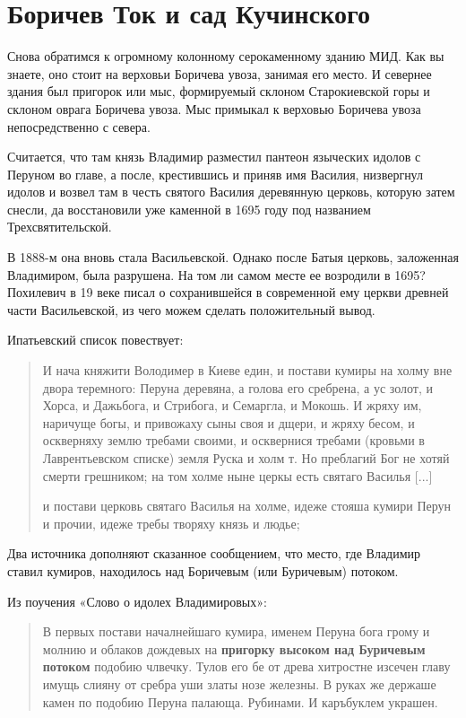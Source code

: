 \chapter {Боричев Ток и сад Кучинского}

Снова обратимся к огромному колонному серокаменному зданию МИД. Как вы знаете, оно стоит на верховьи Боричева увоза, занимая его место. И севернее здания был пригорок или  мыс, формируемый склоном Старокиевской горы и склоном оврага Боричева увоза. Мыс примыкал к верховью Боричева увоза непосредственно с севера.

Считается, что там князь Владимир разместил пантеон языческих идолов с Перуном во главе, а после, крестившись и приняв имя Василия, низвергнул идолов и возвел там в честь святого Василия деревянную церковь, которую затем снесли, да восстановили уже каменной в 1695 году под названием Трехсвятительской.

В 1888-м она вновь стала Васильевской. Однако после Батыя церковь, заложенная Владимиром, была разрушена. На том ли самом месте ее возродили в 1695? Похилевич в 19 веке писал о сохранившейся в современной ему церкви древней части Васильевской, из чего можем сделать положительный вывод.

Ипатьевский список повествует:

\begin{quotation}
И нача княжити Володимер в Киеве един, и постави кумиры на холму вне двора теремного: Перуна деревяна, а голова его сребрена, а ус золот, и Хорса, и Дажьбога, и Стрибога, и Семаргла, и Мокошь. И жряху им, наричуще богы, и привожаху сыны своя и дщери, и жряху бесом, и оскверняху землю требами своими, и осквернися требами (кровьми в Лаврентьевском списке) земля Руска и холм т. Но преблагий Бог не хотяй смерти грешником; на том холме ныне церкы есть святаго Василья [...]

и постави церковь святаго Василья на холме, идеже стояша кумири Перун и прочии, идеже требы творяху князь и людье;
\end{quotation}

Два источника дополняют сказанное сообщением, что место, где Владимир ставил кумиров, находилось над Боричевым (или Буричевым) потоком.

Из поучения «Слово о идолех Владимировых»: 

\begin{quotation}
В первых постави началнейшаго кумира, именем Перуна бога грому и молнию и облаков дождевых на\textbf{ пригорку высоком над Буричевым потоком} подобию члвечку. Тулов его бе от древа хитростне изсечен главу имущь слияну от сребра уши златы нозе железны. В руках же держаше камен по подобию Перуна палающа. Рубинами. И каръбуклем украшен.
\end{quotation}

